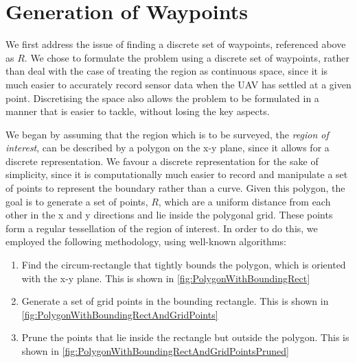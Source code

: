 
\section{Generation of Waypoints}
We first address the issue of finding a discrete set of waypoints, referenced above as $R$. We chose to formulate the problem using a discrete set of waypoints, rather than deal with the case of treating the region as continuous space, since it is much easier to accurately record sensor data when the UAV has settled at a given point. Discretising the space also allows the problem to be formulated in a manner that is easier to tackle, without losing the key aspects.


We began by assuming that the region which is to be surveyed, the \textit{region of interest}, can be described by a polygon on the x-y plane, since it allows for a discrete representation. We favour a discrete representation for the sake of simplicity, since it is computationally much easier to record and manipulate a set of points to represent the boundary rather than a curve. Given this polygon, the goal is to generate a set of points, $R$, which are a uniform distance from each other in the x and y directions and lie inside the polygonal grid. These points form a regular tessellation of the region of interest. In order to do this, we employed the following methodology, using well-known algorithms:
\begin{enumerate}
    \item Find the circum-rectangle that tightly bounds the polygon, which is oriented with the x-y plane. This is shown in \ref{fig:PolygonWithBoundingRect}
    \item Generate a set of grid points in the bounding rectangle. This is shown in \ref{fig:PolygonWithBoundingRectAndGridPoints}
    \item Prune the points that lie inside the rectangle but outside the polygon. This is shown in \ref{fig:PolygonWithBoundingRectAndGridPointsPruned}
\end{enumerate}


